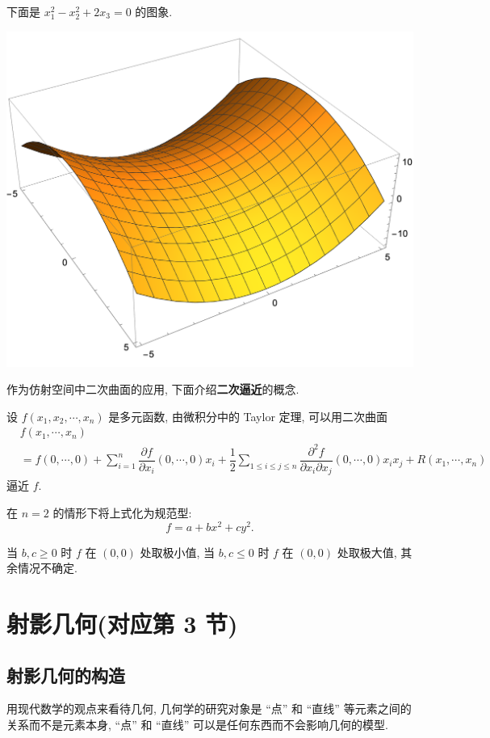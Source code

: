 \documentclass[color=black,device=normal,lang=cn,mode=geye]{elegantnote}
\begin{document}
下面是 $x_1^2-x_2^2+2x_3=0$ 的图象.
\begin{center}
    \includegraphics[scale=.5]{materials/4.png}
\end{center}
作为仿射空间中二次曲面的应用, 下面介绍\textbf{二次逼近}的概念.
\begin{example}
    设 $f(x_1,x_2,\cdots,x_n)$ 是多元函数, 由微积分中的 Taylor 定理, 可以用二次曲面
    \begin{align*}
        & f(x_1,\cdots,x_n) \\
        & =f(0,\cdots,0)+\sum\limits_{i=1}^n\dfrac{\partial f}{\partial x_i}(0,\cdots,0)x_i+\dfrac{1}{2}\sum\limits_{1\leq i\leq j\leq n}\dfrac{\partial^2f}{\partial x_i\partial x_j}(0,\cdots,0)x_ix_j+R(x_1,\cdots,x_n)
    \end{align*}
    逼近 $f$.

    在 $n=2$ 的情形下将上式化为规范型:
    \[f=a+bx^2+cy^2.\]

    当 $b,c\geq0$ 时 $f$ 在 $(0,0)$ 处取极小值, 当 $b,c\leq0$ 时 $f$ 在 $(0,0)$ 处取极大值, 其余情况不确定.
\end{example}
\section{射影几何(对应第 3 节)}
\subsection{射影几何的构造}
用现代数学的观点来看待几何, 几何学的研究对象是 ``点'' 和 ``直线'' 等元素之间的关系而不是元素本身, ``点'' 和 ``直线'' 可以是任何东西而不会影响几何的模型.
\end{document}
